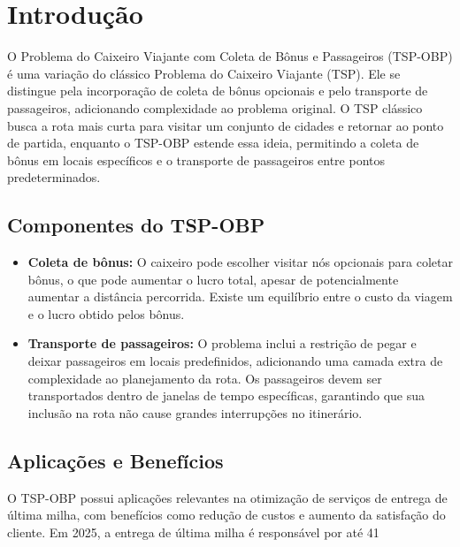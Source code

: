 \documentclass[12pt, a4paper]{report}
\begin{document}

\newpage
\tableofcontents
\thispagestyle{empty}

\newpage
\setcounter{page}{1}
\pagestyle{plain}
\section*{Introdução}
O Problema do Caixeiro Viajante com Coleta de Bônus e Passageiros (TSP-OBP) é uma variação do clássico Problema do Caixeiro Viajante (TSP). Ele se distingue pela incorporação de coleta de bônus opcionais e pelo transporte de passageiros, adicionando complexidade ao problema original. O TSP clássico busca a rota mais curta para visitar um conjunto de cidades e retornar ao ponto de partida, enquanto o TSP-OBP estende essa ideia, permitindo a coleta de bônus em locais específicos e o transporte de passageiros entre pontos predeterminados.
\subsection*{Componentes do TSP-OBP}
\begin{itemize} \item \textbf{Coleta de bônus:} O caixeiro pode escolher visitar nós opcionais para coletar bônus, o que pode aumentar o lucro total, apesar de potencialmente aumentar a distância percorrida. Existe um equilíbrio entre o custo da viagem e o lucro obtido pelos bônus. \item \textbf{Transporte de passageiros:} O problema inclui a restrição de pegar e deixar passageiros em locais predefinidos, adicionando uma camada extra de complexidade ao planejamento da rota. Os passageiros devem ser transportados dentro de janelas de tempo específicas, garantindo que sua inclusão na rota não cause grandes interrupções no itinerário. \end{itemize}
\subsection*{Aplicações e Benefícios}
O TSP-OBP possui aplicações relevantes na otimização de serviços de entrega de última milha, com benefícios como redução de custos e aumento da satisfação do cliente. Em 2025, a entrega de última milha é responsável por até 41%
\end{document}
